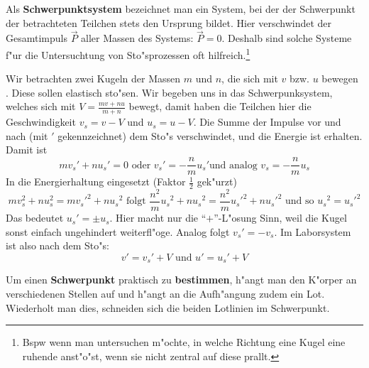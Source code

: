 Als \textbf{Schwerpunktsystem} bezeichnet man ein System, bei der der
Schwerpunkt der betrachteten Teilchen stets den Ursprung bildet. Hier
verschwindet der Gesamtimpuls $\Vec P$ aller Massen des Systems: $\Vec
P = 0$. Deshalb sind solche Systeme f"ur die Untersuchtung von
Sto"sprozessen oft hilfreich.\footnote{Bspw wenn man untersuchen
  m"ochte, in welche Richtung eine Kugel eine ruhende anst"o"st, wenn sie
  nicht zentral auf diese prallt.}

\begin{Beispiel}
   Wir betrachten zwei Kugeln der Massen $m$ und $n$, die sich mit $v$
   bzw. $u$ bewegen 
   .  Diese sollen elastisch sto"sen. Wir begeben uns in das
   Schwerpunksystem, welches sich mit $V = \frac{mv + nu}{m+n}$
   bewegt, damit haben die Teilchen hier die Geschwindigkeit $v_s = v
   - V$ und $u_s = u - V$. Die Summe der Impulse vor und nach (mit $'$
   gekennzeichnet) dem Sto"s verschwindet, und die Energie ist
   erhalten. Damit ist
   \begin{equation*}
      mv_s' + nu_s' = 0 \text{ oder } v_s' = -\frac{n}{m}u_s' \text{
        und analog }      
 v_s = -\frac{n}{m}u_s
   \end{equation*}
In die Energierhaltung eingesetzt (Faktor $\frac{1}{2}$ gek"urzt)
\begin{equation*}
   mv_s^2 + nu_s^2 = m{v_s'}^2 + n{u_s}^2
\text{ folgt }
\frac{n^2}{m} {u_s}^2 + n{u_s}^2 = \frac{n^2}{m} {u_s'}^2 + n{u_s'}^2 
\text{ und so }
{u_s}^2 = {u_s'}^2
\end{equation*}
Das bedeutet $u_s' = \pm u_s$. Hier macht nur die "`$+$"'-L"osung
Sinn, weil die Kugel sonst einfach ungehindert weiterfl"oge. Analog
folgt $v_s' = - v_s$. Im Laborsystem ist also nach dem Sto"s: 
\begin{equation*}
   v' = v_s' + V \text{ und } u' = u_s' + V
\end{equation*}
\end{Beispiel}




\abs Um einen \textbf{Schwerpunkt} praktisch zu \textbf{bestimmen},
h"angt man den K"orper an verschiedenen Stellen auf und h"angt an die
Aufh"angung zudem ein Lot. Wiederholt man dies, schneiden sich die
beiden Lotlinien im Schwerpunkt.











